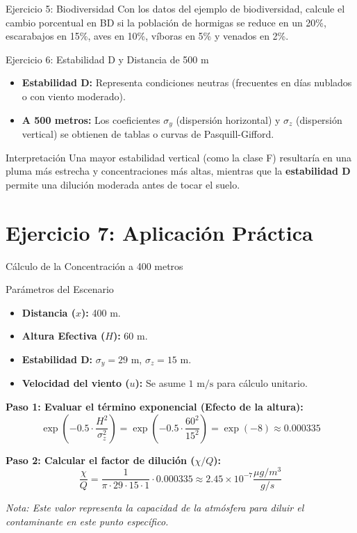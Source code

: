 \documentclass[10pt,compress]{beamer}
\begin{document}
\begin{frame}{Ejercicio 5: Biodiversidad}
Con los datos del ejemplo de biodiversidad, calcule el cambio porcentual en BD si la población de hormigas se reduce en un 20\%, escarabajos en 15\%, aves en 10\%, víboras en 5\% y venados en 2\%.
\end{frame}
\begin{frame}{Ejercicio 6: Estabilidad D y Distancia de 500 m}
    \begin{itemize}
        \item \textbf{Estabilidad D:} Representa condiciones neutras (frecuentes en días nublados o con viento moderado).
        \item \textbf{A 500 metros:} Los coeficientes $\sigma_y$ (dispersión horizontal) y $\sigma_z$ (dispersión vertical) se obtienen de tablas o curvas de Pasquill-Gifford.
    \end{itemize}
    \begin{block}{Interpretación}
        Una mayor estabilidad vertical (como la clase F) resultaría en una pluma más estrecha y concentraciones más altas, mientras que la \textbf{estabilidad D} permite una dilución moderada antes de tocar el suelo.
    \end{block}
\end{frame}
\section{Ejercicio 7: Aplicación Práctica}

\begin{frame}{Cálculo de la Concentración a 400 metros}
    \begin{block}{Parámetros del Escenario}
        \begin{itemize}
            \item \textbf{Distancia ($x$):} 400 m.
            \item \textbf{Altura Efectiva ($H$):} 60 m.
            \item \textbf{Estabilidad D:} $\sigma_y = 29\text{ m}$, $\sigma_z = 15\text{ m}$.
            \item \textbf{Velocidad del viento ($u$):} Se asume $1\text{ m/s}$ para cálculo unitario.
        \end{itemize}
    \end{block}

    \textbf{Paso 1: Evaluar el término exponencial (Efecto de la altura):}
    \[ \exp\left( -0.5 \cdot \frac{H^2}{\sigma_z^2} \right) = \exp\left( -0.5 \cdot \frac{60^2}{15^2} \right) = \exp(-8) \approx 0.000335 \]

    \textbf{Paso 2: Calcular el factor de dilución ($\chi/Q$):}
    \[ \frac{\chi}{Q} = \frac{1}{\pi \cdot 29 \cdot 15 \cdot 1} \cdot 0.000335 \approx 2.45 \times 10^{-7} \frac{\mu g/m^3}{g/s} \]

    \textit{Nota: Este valor representa la capacidad de la atmósfera para diluir el contaminante en este punto específico.}
\end{frame}
\end{document}
